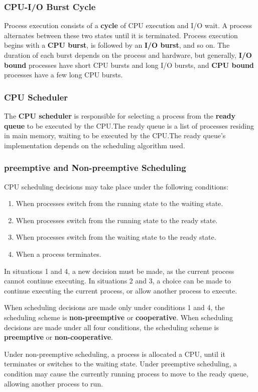 \documentclass{article}
\begin{document}
\subsubsection{CPU-I/O Burst Cycle}
Process execution consists of a \textbf{cycle} of CPU execution and I/O
wait. A process alternates between these two states until it is
terminated. Process execution begins with a \textbf{CPU burst}, is
followed by an \textbf{I/O burst}, and so on. The duration of each
burst depends on the process and hardware, but generally, \textbf{I/O
bound} processes have short CPU bursts and long I/O bursts, and
\textbf{CPU bound} processes have a few long CPU bursts.
\subsubsection{CPU Scheduler}
The \textbf{CPU scheduler} is responsible for selecting a process from
the \textbf{ready queue} to be executed by the CPU.\@ The ready queue
is a list of processes residing in main memory, waiting to be executed
by the CPU.\@ The ready queue's implementation depends on the
scheduling algorithm used.
\subsubsection{preemptive and Non-preemptive Scheduling}
CPU scheduling decisions may take place under the following conditions:
\begin{enumerate}
    \item When processes switch from the running state to the waiting
          state.
    \item When processes switch from the running state to the ready
          state.
    \item When processes switch from the waiting state to the ready
          state.
    \item When a process terminates.
\end{enumerate}
In situations 1 and 4, a new decision must be made, as the current process
cannot continue executing. In situations 2 and 3, a choice can be made
to continue executing the current process, or allow another process to
execute.

When scheduling decisions are made only under conditions 1 and 4, the
scheduling scheme is \textbf{non-preemptive} or \textbf{cooperative}.
When scheduling decisions are made under all four conditions, the
scheduling scheme is \textbf{preemptive} or \textbf{non-cooperative}.

Under non-preemptive scheduling, a process is allocated a CPU, until it
terminates or switches to the waiting state. Under preemptive
scheduling, a condition may cause the currently running process to move
to the ready queue, allowing another process to run.
\end{document}
